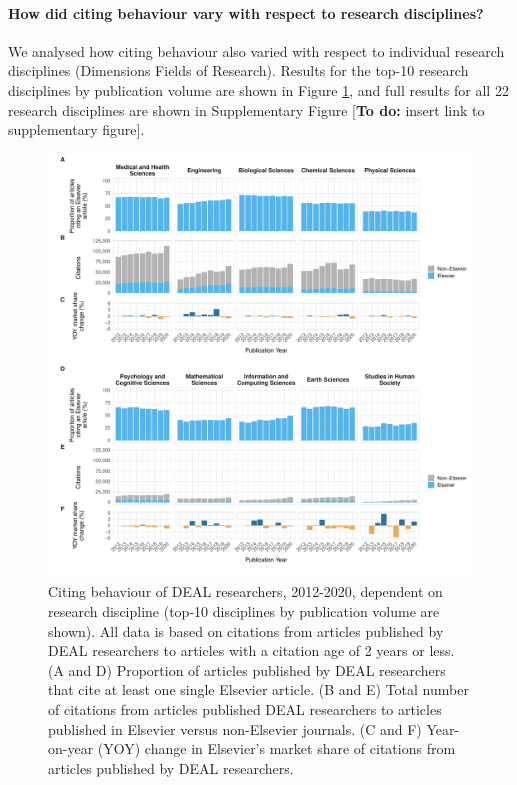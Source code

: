 \documentclass[
]{article}
\begin{document}
\hypertarget{how-did-citing-behaviour-vary-with-respect-to-research-disciplines}{%
\paragraph{How did citing behaviour vary with respect to research disciplines?}\label{how-did-citing-behaviour-vary-with-respect-to-research-disciplines}}

We analysed how citing behaviour also varied with respect to individual research disciplines (Dimensions Fields of Research). Results for the top-10 research disciplines by publication volume are shown in Figure \ref{fig:references-publisher-year-category}, and full results for all 22 research disciplines are shown in Supplementary Figure {[}\textbf{To do:} insert link to supplementary figure{]}.

\begin{figure}
\centering
\includegraphics{analysis_files/figure-latex/references-publisher-year-category-1.pdf}
\caption{\label{fig:references-publisher-year-category}Citing behaviour of DEAL researchers, 2012-2020, dependent on research discipline (top-10 disciplines by publication volume are shown). All data is based on citations from articles published by DEAL researchers to articles with a citation age of 2 years or less. (A and D) Proportion of articles published by DEAL researchers that cite at least one single Elsevier article. (B and E) Total number of citations from articles published DEAL researchers to articles published in Elsevier versus non-Elsevier journals. (C and F) Year-on-year (YOY) change in Elsevier's market share of citations from articles published by DEAL researchers.}
\end{figure}
\end{document}
